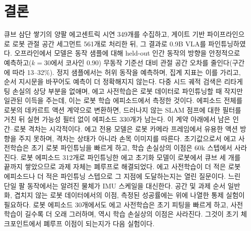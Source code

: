 \documentclass[conference,10pt]{IEEEtran}
\newcounter{rpart}
\newcommand{\reportpart}[3]{\clearpage\stepcounter{rpart}\setcounter{section}{0}%
  \twocolumn[{\centering{\LARGE\bfseries #1\par}\vspace{1.5mm}{\large #2\par}\vspace{3mm}\hrule\vspace{5mm}}]\label{#3}}
\begin{document}
\section{결론}
큐브 삼단 쌓기의 양팔 에고센트릭 시연 349개를 수집하고, 게이트 기반 파이프라인으로 로봇 관절 공간 세그먼트 561개로 처리한 뒤, 그 결과로
0.9B VLA를 파인튜닝하였다. 오프라인에서 모델은 동작 샘플에 대해 held-out 인간 동작의 방향을 안정적으로 예측하고($k{=}30$에서 코사인
0.90) 무동작 기준선 대비 관절 공간 오차를 줄인다(구간에 따라 13--32\%). 정지 샘플에서는 허위 동작을 예측하며, 집계 지표는 이를 가리고,
순서 지시문을 바꾸어도 예측이 더 정확해지지 않는다. 다중 시드 궤적 검색은 리타게팅 손실의 상당 부분을 없애며, 에고 사전학습은 로봇
데이터로 파인튜닝할 때 작지만 일관된 이득을 주는데, 이는 로봇 학습 에피소드에서 측정한 것이다. 에피소드 전체를 로봇의 데카르트 액션 계약으로
변환하면, 드러나지 않는 SLAM 점프에 대한 필터를 거친 뒤 실현 가능성 필터 없이 에피소드 330개가 남는다. 이 계약 아래에서 남은 인간--로봇
격차는 시각적이다. 에고 전용 모델은 로봇 카메라 프레임에서 유용한 액션 방향을 주지 못하며, 격차는 상태가 아니라 손목 이미지를 따른다.
초기값으로서 에고 사전학습은 초기 로봇 파인튜닝을 빠르게 하고, 학습 손실상의 이점은 60k 스텝에서 사라진다. 로봇 에피소드 312개로
파인튜닝한 에고 초기화 모델이 로봇에서 큐브 세 개를 끝까지 쌓았으므로 과제 자체는 폐루프로 해결되었다. 에고 사전학습이 더 적은 로봇
에피소드나 더 적은 파인튜닝 스텝으로 그 지점에 도달하는지는 열린 질문이다. 느린 단일 팔 동작에서는 알려진 물체가 IMU 스케일을 대신한다.
공간 및 과제 순서 일반화, 겹치지 않는 로봇 데이터에서의 이점, 측정된 성공률에는 위에 나열한 통제 실험이 필요하다. 로봇 에피소드 30개에서도
에고 사전학습은 초기 피팅을 빠르게 하고, 사전학습이 길수록 더 오래 그러하며, 역시 학습 손실상의 이점은 사라진다. 그것이 초기
체크포인트에서 폐루프 이점이 되는지가 다음 실험이다.
\reportpart{제2부}{단일 팔 큐브 접근(Approach)}{part:p2}
\end{document}
